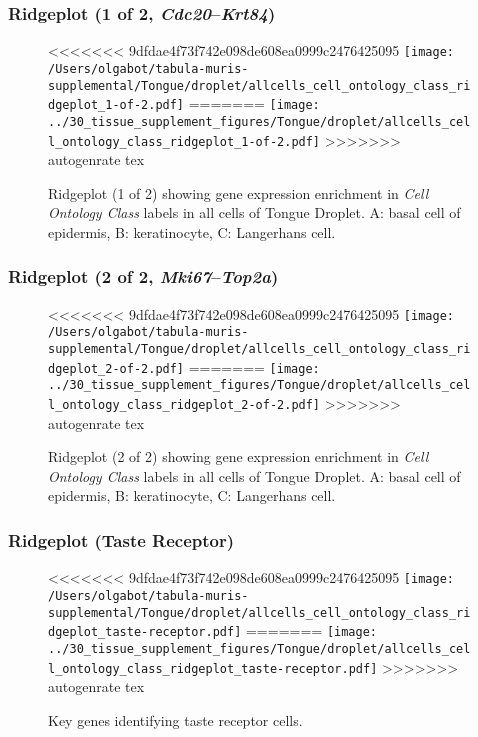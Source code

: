 \subsubsection{Ridgeplot (1 of 2, \emph{Cdc20}--\emph{Krt84})}
\begin{figure}[h]
\centering
<<<<<<< 9dfdae4f73f742e098de608ea0999c2476425095
\texttt{[image: /Users/olgabot/tabula-muris-supplemental/Tongue/droplet/allcells\_cell\_ontology\_class\_ridgeplot\_1-of-2.pdf]}
=======
\texttt{[image: ../30\_tissue\_supplement\_figures/Tongue/droplet/allcells\_cell\_ontology\_class\_ridgeplot\_1-of-2.pdf]}
>>>>>>> autogenrate tex

\caption{ Ridgeplot (1 of 2)  showing gene expression enrichment in \emph{Cell Ontology Class} labels in all cells of Tongue Droplet. A: basal cell of epidermis, B: keratinocyte, C: Langerhans cell.}
\end{figure}


\clearpage

\subsubsection{Ridgeplot (2 of 2, \emph{Mki67}--\emph{Top2a})}
\begin{figure}[h]
\centering
<<<<<<< 9dfdae4f73f742e098de608ea0999c2476425095
\texttt{[image: /Users/olgabot/tabula-muris-supplemental/Tongue/droplet/allcells\_cell\_ontology\_class\_ridgeplot\_2-of-2.pdf]}
=======
\texttt{[image: ../30\_tissue\_supplement\_figures/Tongue/droplet/allcells\_cell\_ontology\_class\_ridgeplot\_2-of-2.pdf]}
>>>>>>> autogenrate tex

\caption{ Ridgeplot (2 of 2)  showing gene expression enrichment in \emph{Cell Ontology Class} labels in all cells of Tongue Droplet. A: basal cell of epidermis, B: keratinocyte, C: Langerhans cell.}
\end{figure}


\clearpage

\subsubsection{Ridgeplot (Taste Receptor)}
\begin{figure}[h]
\centering
<<<<<<< 9dfdae4f73f742e098de608ea0999c2476425095
\texttt{[image: /Users/olgabot/tabula-muris-supplemental/Tongue/droplet/allcells\_cell\_ontology\_class\_ridgeplot\_taste-receptor.pdf]}
=======
\texttt{[image: ../30\_tissue\_supplement\_figures/Tongue/droplet/allcells\_cell\_ontology\_class\_ridgeplot\_taste-receptor.pdf]}
>>>>>>> autogenrate tex

\caption{Key genes identifying taste receptor cells.
}
\end{figure}


